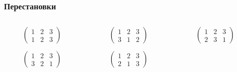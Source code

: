 \begin{frame}
    \frametitle{Перестановки}
    \begin{columns}
        \begin{column}{0.33\textwidth}
            \begin{equation*}
                \left(\begin{array}{ccc}
                    1 & 2 & 3 \\
                    1 & 2 & 3
                \end{array}\right)
            \end{equation*}
            \par\vspace{0.3cm}
            \begin{equation*}
                \left(\begin{array}{ccc}
                    1 & 2 & 3 \\
                    3 & 2 & 1
                \end{array}\right)
            \end{equation*}
        \end{column}
        \begin{column}{0.33\textwidth}
            \begin{equation*}
                \left(\begin{array}{ccc}
                    1 & 2 & 3 \\
                    3 & 1 & 2 
                \end{array}\right)
            \end{equation*}
            \par\vspace{0.3cm}
            \begin{equation*}
                \left(\begin{array}{ccc}
                    1 & 2 & 3 \\
                    2 & 1 & 3
                \end{array}\right)
            \end{equation*}
        \end{column}
        \begin{column}{0.33\textwidth}
            \begin{equation*}
                \left(\begin{array}{ccc}
                    1 & 2 & 3 \\
                    2 & 3 & 1 
                \end{array}\right)

\end{equation*}
\end{column}
\end{columns}
\end{frame}
